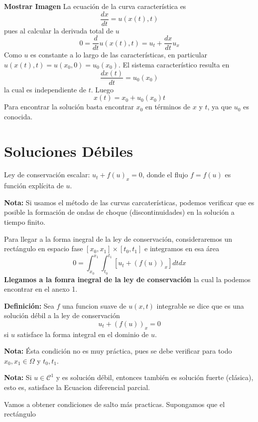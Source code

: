 \textbf{Mostrar Imagen}
La ecuación de la curva característica es
\[
\frac{dx}{dt} = u(x(t), t)
\]
pues al calcular la derivada total de $u$
\[
0 = \frac{d}{dt} u(x(t), t) = u_t + \frac{dx}{dt} u_x
\]
Como $u$ es constante a lo largo de las características, en particular $u(x(t), t) = u(x_0, 0) = u_0(x_0)$.
El sistema característico resulta en
\[
\frac{dx(t)}{dt} = u_0(x_0)
\]
la cual es independiente de $t$. Luego
\[
x(t) = x_0 + u_0(x_0) t
\]
Para encontrar la solución basta encontrar $x_0$ en términos de $x$ y $t$, ya que $u_0$ es conocida.

\section{Soluciones Débiles}
Ley de conservación escalar: $ u_t + f(u)_x = 0 $, donde el flujo $f = f(u)$ es función explícita de $u$.

\textbf{Nota: } Si usamos el método de las curvas carcaterísticas, podemos verificar que es posible la formación de ondas de choque (discontinuidades) en la solución a tiempo finito.

Para llegar a la forma inegral de la ley de conservación, consideraremos un rectángulo en espacio fase $[x_0,x_1]\times[t_0, t_1]$ e integramos en esa área
\[
0 = \int_{x_0}^{x_1} \int_{t_0}^{t_1} \left[ u_t + (f(u))_x \right] dt dx
\]
\textbf{Llegamos a la fomra inegral de la ley de conservación } la cual la podemos encontrar en el anexo 1.

\textbf{Definición: } Sea $f$ una funcion suave de $u(x,t)$ integrable se dice que es una solución débil a la ley de conservación 
\[
u_t + (f(u))_x = 0
\]
si $u$ satisface la forma integral en el dominio de $u$.

\textbf{Nota: } Ésta condición no es muy práctica, pues se debe verificar para todo $x_0, x_1  \in \Omega$ y $t_0, t_1$.

\textbf{Nota: } Si $u \in \mathcal{C}^1$ y es solución débil, entonces también es solución fuerte (clásica), esto es, satisface la Ecuacion diferencial parcial.

Vamos a obtener condiciones de salto más practicas. Supongamos que el rectángulo 




